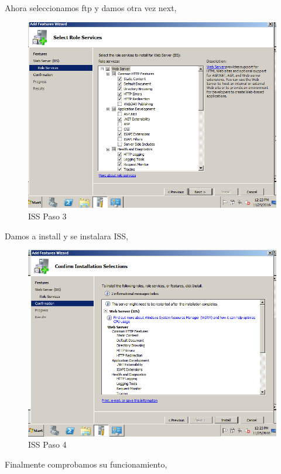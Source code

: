 Ahora seleccionamos ftp y damos otra vez next,

	\begin{figure}[H]
	\centering
	\includegraphics[scale=0.35]{pics/gui3.png} 
	\caption{ISS Paso 3} \label{fig:iss3}
	\end{figure}

Damos a install y se instalara ISS,

	\begin{figure}[H]
	\centering
	\includegraphics[scale=0.35]{pics/gui4.png} 
	\caption{ISS Paso 4} \label{fig:iss4}
	\end{figure}

Finalmente comprobamos su funcionamiento,

